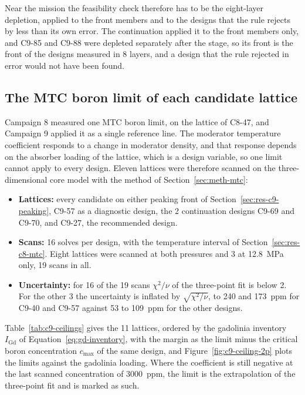 Near the mission the feasibility check therefore has to be the
eight-layer depletion, applied to the front members and to the designs
that the rule rejects by less than its own error. The continuation
applied it to the front members only, and C9-85 and C9-88 were depleted
separately after the stage, so its front is the front of the designs
measured in 8 layers, and a design that the rule rejected in error
would not have been found.

\subsection{The MTC boron limit of each candidate lattice}
\label{sec:res-c9-ceiling}

Campaign 8 measured one MTC boron limit, on the lattice of C8-47, and
Campaign 9 applied it as a single reference line. The moderator
temperature coefficient responds to a change in moderator density, and
that response depends on the absorber loading of the lattice, which is
a design variable, so one limit cannot apply to every design. Eleven
lattices were therefore scanned on the three-dimensional core model
with the method of Section~\ref{sec:meth-mtc}:

\begin{itemize}
  \item \textbf{Lattices:} every candidate on either peaking front of
        Section~\ref{sec:res-c9-peaking}, C9-57 as a diagnostic
        design, the 2 continuation designs C9-69 and C9-70, and C9-27, the
        recommended design.
  \item \textbf{Scans:} 16 solves per design, with the temperature
        interval of Section~\ref{sec:res-c8-mtc}. Eight lattices were
        scanned at both pressures and 3 at \SI{12.8}{MPa} only, 19
        scans in all.
  \item \textbf{Uncertainty:} for 16 of the 19 scans $\chi^2/\nu$ of
        the three-point fit is below 2. For the other 3 the
        uncertainty is inflated by $\sqrt{\chi^2/\nu}$, to 240 and \SI{173}{ppm}
        for C9-40 and C9-57 against 53 to \SI{109}{ppm} for the other
        designs.
\end{itemize}

Table~\ref{tab:c9-ceilings} gives the 11 lattices, ordered by the
gadolinia inventory $I_\mathrm{Gd}$ of
Equation~\eqref{eq:gd-inventory}, with the margin as the limit minus the
critical boron concentration $c_\mathrm{max}$ of the same design, and
Figure~\ref{fig:c9-ceiling-2p} plots the limits against the gadolinia
loading. Where the coefficient is still negative at the last scanned
concentration of \SI{3000}{ppm}, the limit is the extrapolation of the
three-point fit and is marked as such.

